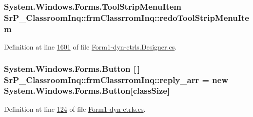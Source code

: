 \hypertarget{class_sr_p___classroom_inq_1_1frm_classrrom_inq_a1b4d7ae0d344dc1fda1561a1d652fa6c}{
\subsubsection[{redo\-Tool\-Strip\-Menu\-Item}]{\setlength{\rightskip}{0pt plus 5cm}\-System.\-Windows.\-Forms.\-Tool\-Strip\-Menu\-Item {\bf \-Sr\-P\-\_\-\-Classroom\-Inq\-::frm\-Classrrom\-Inq\-::redo\-Tool\-Strip\-Menu\-Item}}}
\label{class_sr_p___classroom_inq_1_1frm_classrrom_inq_a1b4d7ae0d344dc1fda1561a1d652fa6c}


\-Definition at line \hyperlink{_form1-dyn-ctrls_8_designer_8cs_source_l01601}{1601} of file \hyperlink{_form1-dyn-ctrls_8_designer_8cs_source}{\-Form1-\/dyn-\/ctrls.\-Designer.\-cs}.

\hypertarget{class_sr_p___classroom_inq_1_1frm_classrrom_inq_a46ee30d934a5219840e4381a66728f0f}{
\subsubsection[{reply\-\_\-arr}]{\setlength{\rightskip}{0pt plus 5cm}\-System.\-Windows.\-Forms.\-Button \mbox{[}$\,$\mbox{]} {\bf \-Sr\-P\-\_\-\-Classroom\-Inq\-::frm\-Classrrom\-Inq\-::reply\-\_\-arr} = new \-System.\-Windows.\-Forms.\-Button\mbox{[}{\bf class\-Size}\mbox{]}}}
\label{class_sr_p___classroom_inq_1_1frm_classrrom_inq_a46ee30d934a5219840e4381a66728f0f}


\-Definition at line \hyperlink{_form1-dyn-ctrls_8cs_source_l00124}{124} of file \hyperlink{_form1-dyn-ctrls_8cs_source}{\-Form1-\/dyn-\/ctrls.\-cs}.

